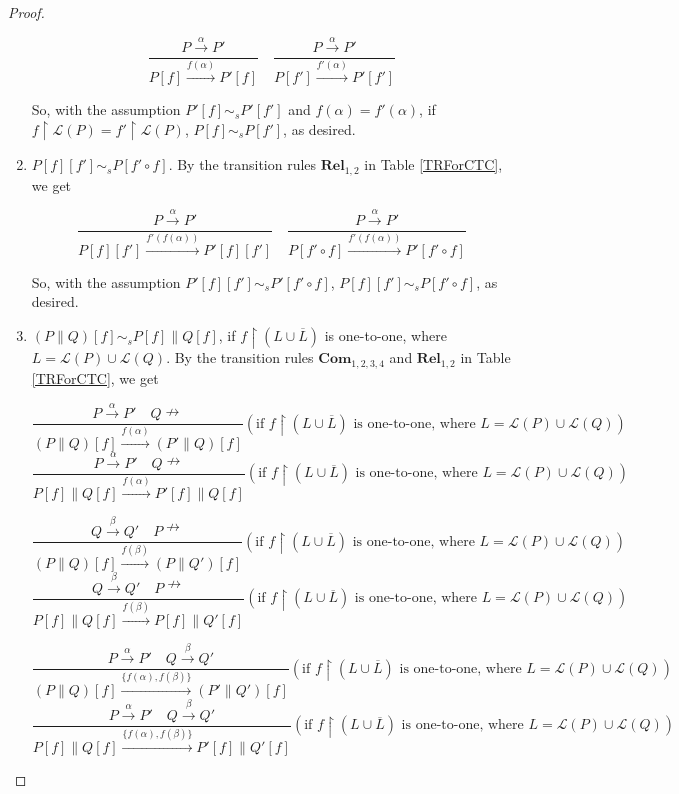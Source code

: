 \begin{proof}
\begin{enumerate}
      $$\frac{P\xrightarrow{\alpha}P'}{P[f]\xrightarrow{f(\alpha)}P'[f]}\quad \frac{P\xrightarrow{\alpha}P'}{P[f']\xrightarrow{f'(\alpha)}P'[f']}$$

      So, with the assumption $P'[f]\sim_s P'[f']$ and $f(\alpha)=f'(\alpha)$, if $f\upharpoonright\mathcal{L}(P)=f'\upharpoonright\mathcal{L}(P)$, $P[f]\sim_s P[f']$, as desired.
  \item $P[f][f']\sim_s P[f'\circ f]$. By the transition rules $\textbf{Rel}_{1,2}$ in Table \ref{TRForCTC}, we get

      $$\frac{P\xrightarrow{\alpha}P'}{P[f][f']\xrightarrow{f'(f(\alpha))}P'[f][f']}\quad \frac{P\xrightarrow{\alpha}P'}{P[f'\circ f]\xrightarrow{f'(f(\alpha))}P'[f'\circ f]}$$

      So, with the assumption $P'[f][f']\sim_s P'[f'\circ f]$, $P[f][f']\sim_s P[f'\circ f]$, as desired.
  \item $(P\parallel Q)[f]\sim_s P[f]\parallel Q[f]$, if $f\upharpoonright(L\cup\overline{L})$ is one-to-one, where $L=\mathcal{L}(P)\cup\mathcal{L}(Q)$. By the transition rules $\textbf{Com}_{1,2,3,4}$ and $\textbf{Rel}_{1,2}$ in Table \ref{TRForCTC}, we get

      $$\frac{P\xrightarrow{\alpha}P'\quad Q\nrightarrow}{(P\parallel Q)[f]\xrightarrow{f(\alpha)}(P'\parallel Q)[f]}(\textrm{if } f\upharpoonright(L\cup\overline{L}) \textrm{ is one-to-one, where }L=\mathcal{L}(P)\cup\mathcal{L}(Q))$$
      $$\frac{P\xrightarrow{\alpha}P'\quad Q\nrightarrow}{P[f]\parallel Q[f]\xrightarrow{f(\alpha)}P'[f]\parallel Q[f]}(\textrm{if } f\upharpoonright(L\cup\overline{L}) \textrm{ is one-to-one, where }L=\mathcal{L}(P)\cup\mathcal{L}(Q))$$

      $$\frac{Q\xrightarrow{\beta}Q'\quad P\nrightarrow}{(P\parallel Q)[f]\xrightarrow{f(\beta)}(P\parallel Q')[f]}(\textrm{if } f\upharpoonright(L\cup\overline{L}) \textrm{ is one-to-one, where }L=\mathcal{L}(P)\cup\mathcal{L}(Q))$$
      $$\frac{Q\xrightarrow{\beta}Q'\quad P\nrightarrow}{P[f]\parallel Q[f]\xrightarrow{f(\beta)}P[f]\parallel Q'[f]}(\textrm{if } f\upharpoonright(L\cup\overline{L}) \textrm{ is one-to-one, where }L=\mathcal{L}(P)\cup\mathcal{L}(Q))$$

      $$\frac{P\xrightarrow{\alpha}P'\quad Q\xrightarrow{\beta}Q'}{(P\parallel Q)[f]\xrightarrow{\{f(\alpha),f(\beta)\}}(P'\parallel Q')[f]}(\textrm{if } f\upharpoonright(L\cup\overline{L}) \textrm{ is one-to-one, where }L=\mathcal{L}(P)\cup\mathcal{L}(Q))$$
      $$\frac{P\xrightarrow{\alpha}P'\quad Q\xrightarrow{\beta}Q'}{P[f]\parallel Q[f]\xrightarrow{\{f(\alpha),f(\beta)\}}P'[f]\parallel Q'[f]}(\textrm{if } f\upharpoonright(L\cup\overline{L}) \textrm{ is one-to-one, where }L=\mathcal{L}(P)\cup\mathcal{L}(Q))$$


\end{enumerate}
\end{proof}
